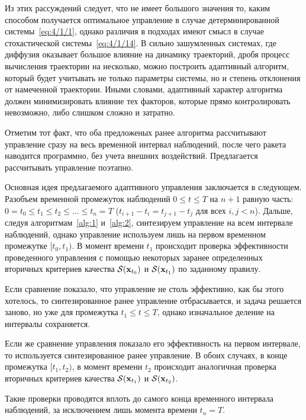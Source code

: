 Из этих рассуждений следует, что не имеет большого значения то, каким способом получается оптимальное управление в случае детерминированной системы~\vref{eq:4/1/1}, однако различия в подходах имеют смысл в случае стохастической системы~\vref{eq:4/1/14}. В сильно зашумленных системах, где диффузия оказывает большое влияние на динамику траекторий, дробя процесс вычисления траектории на несколько, можно построить адаптивный алгоритм, который будет учитывать не только параметры системы, но и степень отклонения от намеченной траектории. Иными словами, адаптивный характер алгоритма должен минимизировать влияние тех факторов, которые прямо контролировать невозможно, либо слишком сложно и затратно.

Отметим тот факт, что оба предложеных ранее алгоритма рассчитывают управление сразу на весь временной интервал наблюдений, после чего ракета наводится программно, без учета внешних воздействий. Предлагается рассчитывать управление поэтапно.

\br

Основная идея предлагаемого адаптивного управления заключается в следующем. Разобъем временной промежуток наблюдений $0 \leqslant t \leqslant T$ на $n+1$ равную часть: $0 = t_0 \leqslant t_1 \leqslant t_2 \leqslant \ldots \leqslant t_{n} = T$ ($t_{i+1}-t_i = t_{j+1}-t_j$ для всех $i, j < n$). Дальше, следуя алгоритмам~\ref{alg:1} и~\ref{alg:2}, синтезируем управление на всем интервале наблюдений, однако управление используем лишь на первом временном промежутке $[t_0, t_1)$. В момент времени $t_1$ происходит проверка эффективности проведенного управления с помощью некоторых заранее определенных вторичных критериев качества $\mathcal{S}(\mathbf{x}_{t_0})$ и $\mathcal{S}(\mathbf{x}_{t_1})$ по заданному правилу.

Если сравнение показало, что управление не столь эффективно, как бы этого хотелось, то синтезированное ранее управление отбрасывается, и задача решается заново, но уже для промежутка $t_1 \leqslant t \leqslant T$, однако изначальное деление на интервалы сохраняется.

Если же сравнение управления показало его эффективность на первом интервале, то используется синтезированное ранее управление. В обоих случаях, в конце промежутка $[t_1, t_2)$, в момент времени $t_2$ происходит аналогичная проверка вторичных критериев качества $\mathcal{S}(\mathbf{x}_{t_1})$ и $\mathcal{S}(\mathbf{x}_{t_2})$.

Такие проверки проводятся вплоть до самого конца временного интервала наблюдений, за исключением лишь момента времени $t_n = T$.



